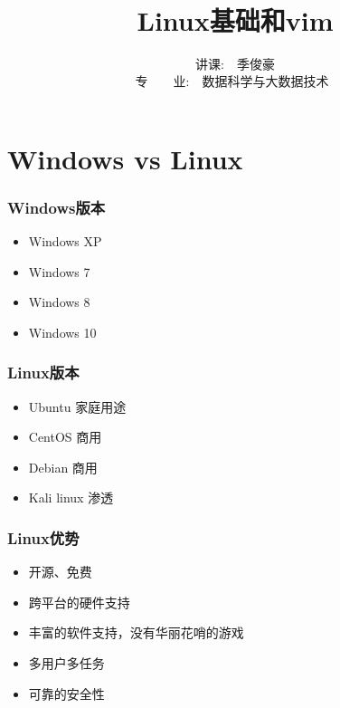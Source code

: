 \documentclass[notheorems,serif]{beamer}
\begin{document}
\title[Linux基础和vim]{{\small{}~~~~~~~~~~~~~~~~~~~~~~~~~~~~~~~~~~~~~~~~~~~~~~
~~~~~~~~~~~} \\
Linux基础和vim
}




\author[]{~~讲课:~~季俊豪~~ \\
\vspace{0.2cm}~专~~~~业:~~数据科学与大数据技术~~}

\institute[湘潭大学数学与计算科学学院]

\date[\today]


\frame[plain]{\titlepage}






\section{Windows vs Linux}

\begin{frame}
\frametitle{Windows版本}
\begin{itemize}
\item Windows XP
\item Windows 7
\item Windows 8
\item Windows 10
\end{itemize}
\end{frame}

\begin{frame}
\frametitle{Linux版本}
\begin{itemize}
\item Ubuntu 家庭用途
\item CentOS 商用
\item Debian 商用
\item Kali linux 渗透
\end{itemize}
\end{frame}

\begin{frame}
\frametitle{Linux优势}
\begin{itemize}
\item 开源、免费
\item 跨平台的硬件支持
\item 丰富的软件支持，没有华丽花哨的游戏
\item 多用户多任务
\item 可靠的安全性
\end{itemize}
\end{frame}
\end{document}
